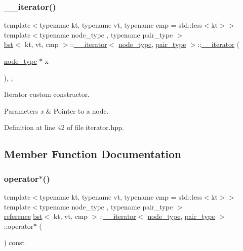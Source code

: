 \subsubsection{\texorpdfstring{\+\_\+\+\_\+iterator()}{\_\_iterator()}}
{\footnotesize\ttfamily template$<$typename kt, typename vt, typename cmp = std\+::less$<$kt$>$$>$ \\
template$<$typename node\+\_\+type , typename pair\+\_\+type $>$ \\
\hyperlink{classbst}{bst}$<$ kt, vt, cmp $>$\+::\hyperlink{classbst_1_1____iterator}{\+\_\+\+\_\+iterator}$<$ \hyperlink{classbst_a062eb2a1ac54802dbc4f0f74ae2afd01}{node\+\_\+type}, \hyperlink{classbst_a7b11cca2a3b4394915600194f741ab16}{pair\+\_\+type} $>$\+::\hyperlink{classbst_1_1____iterator}{\+\_\+\+\_\+iterator} (\begin{DoxyParamCaption}\item[{\hyperlink{classbst_a062eb2a1ac54802dbc4f0f74ae2afd01}{node\+\_\+type} $\ast$}]{x }\end{DoxyParamCaption})\hspace{0.3cm}{\ttfamily [inline]}, {\ttfamily [explicit]}, {\ttfamily [private]}}



Iterator custom constructor. 


\begin{DoxyParams}{Parameters}
{\em x} & Pointer to a node. \\
\hline
\end{DoxyParams}


Definition at line 42 of file iterator.\+hpp.



\subsection{Member Function Documentation}
\mbox{\label{classbst_1_1____iterator_a48688559dd7c14b19228c58466dc9880}} 
\subsubsection{\texorpdfstring{operator$\ast$()}{operator*()}}
{\footnotesize\ttfamily template$<$typename kt, typename vt, typename cmp = std\+::less$<$kt$>$$>$ \\
template$<$typename node\+\_\+type , typename pair\+\_\+type $>$ \\
\hyperlink{classbst_1_1____iterator_a3189983e4edb73a8ce449b290ceb97d1}{reference} \hyperlink{classbst}{bst}$<$ kt, vt, cmp $>$\+::\hyperlink{classbst_1_1____iterator}{\+\_\+\+\_\+iterator}$<$ \hyperlink{classbst_a062eb2a1ac54802dbc4f0f74ae2afd01}{node\+\_\+type}, \hyperlink{classbst_a7b11cca2a3b4394915600194f741ab16}{pair\+\_\+type} $>$\+::operator$\ast$ (\begin{DoxyParamCaption}{ }\end{DoxyParamCaption}) const\hspace{0.3cm}{\ttfamily [inline]}}



